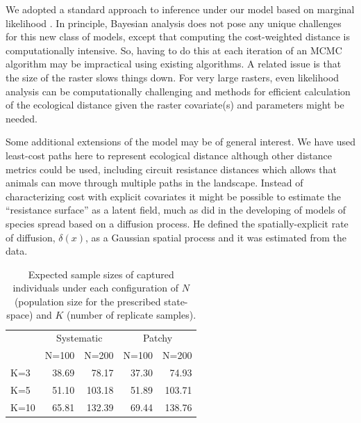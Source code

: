 \documentclass[12pt]{article}
\begin{document}
\begin{spacing}{1.8}
We adopted a standard approach to inference under our model based on
marginal likelihood \citep{borchers_efford:2008}. In principle,
Bayesian analysis does not pose any unique challenges for this new
class of models, except that computing the cost-weighted distance is
computationally intensive.  So, having to do this at each iteration of
an MCMC algorithm may be impractical using existing algorithms.  A
related issue is that the size of the raster slows things down. For
very large rasters, even likelihood analysis can be computationally
challenging and methods for efficient calculation of the ecological
distance given the raster covariate(s) and parameters might be needed.


Some additional extensions of the model may be of general interest.
We have used least-cost paths here to represent ecological distance
although other distance metrics could be used, including circuit
resistance distances \citep{mcrae:2006} which allows that animals can
move through multiple paths in the landscape.  Instead of
characterizing cost with explicit covariates it might be possible to
estimate the ``resistance surface'' as a latent field, much as
\citep{wikle:2003} did in the developing of models of species spread
based on a diffusion process. He defined the spatially-explicit rate
of diffusion, $\delta(x)$, as a Gaussian spatial process and it was
estimated from the data.












\end{spacing}

\newpage




\newpage


\begin{table}[ht]
\centering
\caption{
Expected sample sizes of captured individuals under each configuration of
$N$ (population size for the prescribed state-space) and $K$ (number of replicate samples).
}
\begin{tabular}{l|rrrr}
 & \multicolumn{2}{c}{Systematic} & \multicolumn{2}{c}{Patchy}  \\
    & N=100 &  N=200  &   N=100 &  N=200  \\ \hline
K=3 &  38.69 &   78.17  &   37.30 &   74.93  \\
K=5 &  51.10 &  103.18  &   51.89 &  103.71 \\
K=10&  65.81 &  132.39  &   69.44 &  138.76 \\
\end{tabular}
\label{tab.samplesize}
\end{table}
\end{document}
